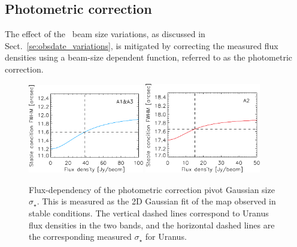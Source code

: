 \subsection{Photometric correction}%
\label{se:photometric_correction}

The effect of the \afternoon\ beam size variations, as discussed
in Sect.~\ref{se:obsdate_variations}, is mitigated by correcting the measured flux
densities using a beam-size dependent function, referred to as the
photometric correction.

\begin{figure}[ht!]
  \begin{center}
    \includegraphics[clip=true, trim={0, -0.3cm, -0.3cm, 0}, width=0.45\textwidth]{Figures/Photocorr/FWHM_stable_empiric_ref_1mm.pdf}
    \includegraphics[clip=true, trim={0, -0.3cm, -0.3cm, 0}, width=0.45\textwidth]{Figures/Photocorr/FWHM_stable_empiric_ref_a2.pdf}
    \caption[Photometric correction pivot Gaussian
      size]{Flux-dependency of the photometric correction pivot
      Gaussian size $\sigma_\star$. This is measured as the 2D
      Gaussian fit of the map observed in stable conditions.
      The vertical dashed lines correspond to Uranus flux densities in
      the two bands, and the horizontal dashed lines are the
      corresponding measured
      $\sigma_\star$ for Uranus.}
    \label{fig:sigma_stable_vs_flux}
  \end{center}
\end{figure}

